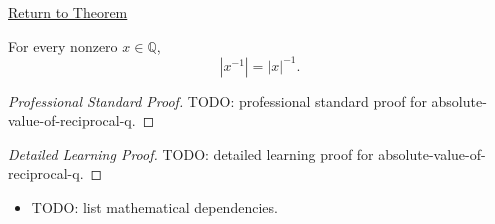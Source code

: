 \newpage
{}
\label{prf:absolute-value-of-reciprocal-q}

\begin{remark*}[Return]
\hyperref[thm:absolute-value-of-reciprocal-q]{Return to Theorem}
\end{remark*}

\begin{theorem*}
For every nonzero $x\in\mathbb{Q}$,
\[
|x^{-1}|=|x|^{-1}.
\]
\end{theorem*}

\begin{proof}[Professional Standard Proof]
\LRAProofBodyStart
TODO: professional standard proof for absolute-value-of-reciprocal-q.
\end{proof}

\begin{proof}[Detailed Learning Proof]
\LRAProofBodyStart
TODO: detailed learning proof for absolute-value-of-reciprocal-q.
\end{proof}

\begin{remark*}
\end{remark*}

\begin{dependencies}
\begin{itemize}
  \item TODO: list mathematical dependencies.
\end{itemize}
\end{dependencies}

\clearpage
